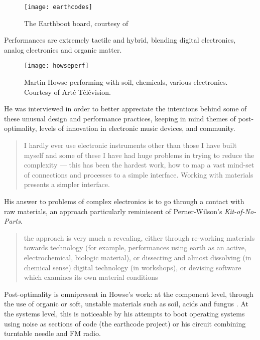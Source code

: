 \begin{figure}[H]
	  \centering
	    \texttt{[image: earthcodes]}
	     \caption{The Earthboot board, courtesy of \citep{whitelaw2013}}
	\end{figure}

Performances are extremely tactile and hybrid, blending digital electronics, analog electronics and organic matter. 

\begin{figure}[H]
	  \caption{Martin Howse performing with soil, chemicals, various electronics. Courtesy of Arté Télévision.}
	  \centering
	    \texttt{[image: howseperf]}
	\end{figure}
	
He was interviewed in order to better appreciate the intentions behind some of these unusual design and performance practices, keeping in mind themes of post-optimality, levels of innovation in electronic music devices, and community.  

\begin{quote}
	I hardly ever use electronic instruments other than those I have built myself and some of these I have had huge problems in trying to reduce the complexity — this has been the hardest work, how to map a vast mind-set of connections and processes to a simple interface. Working with materials presents a simpler interface.
\end{quote}

His answer to problems of complex electronics is to go through a contact with raw materials, an approach particularly reminiscent of Perner-Wilson's \textit{Kit-of-No-Parts}. 

\begin{quote}
	the approach is very much a revealing, either through re-working materials towards technology (for example, performances using earth as an active, electrochemical, biologic material), or dissecting and almost dissolving (in chemical sense) digital technology (in workshops), or devising software which examines its own material conditions
\end{quote}

Post-optimality is omnipresent in Howse's work: at the component level, through the use of organic or soft, unstable materials such as soil, acids and fungus \citep{howse}. At the systems level, this is noticeable by his attempts to boot operating systems using noise as sections of code (the earthcode project) or his circuit combining turntable needle and FM radio. 

